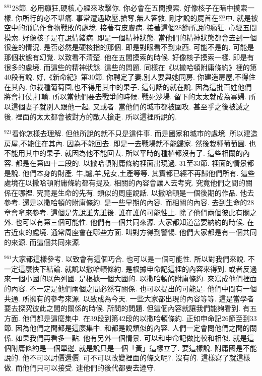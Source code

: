 \documentclass{book}
\begin{document}
$^{881}$28節.
必用癲狂,硬核,心經來攻擊你.
你必會在五間摸索.
好像核子在暗中摸索一樣.
你所行的必不堪痛.
事常遭遇欺壓,搶奪,無人答救.
剛才說的屍首在空中.
就是被空中的飛鳥作食物戰敗的處境.
接著有皮膚病.
接著這個28節所說的癲狂.
心經五間摸索.
好像核子是在說情緒病.
即是一個精神狀態.
當他們的精神狀態都會去到一個很差的情況.
是否必然是硬核指的那個.
即是對眼看不到東西.
可能不是的.
可能是那個狀態有幻覺.
以致看不清楚.
他在五間摸索的時候.
好像核子摸索一樣.
即是有很多的處境.
而這些的精神狀態.
這些的問題.
同樣在《以撒哈頓附庸條約》裡的第40段有說.
好,《新命紀》第30節.
你聘定了妻,別人要與她同房.
你建造房屋,不得住在其內.
你栽種葡萄園,也不得用其中的果子.
這句話的就在說.
因為這批百姓他們將會打仗,打輸.
所以當他們要去戰爭的時候.
戰死沙場.
留下的太太就成為寡婦.
所以這個妻子就別人跟他一起.
又或者.
當他們的城市都被圍攻.
甚至乎之後被滅之後.
裡面的太太都會被對方的敵人搶走.
所以這裡所說的.

$^{921}$看你怎樣去理解.
但他所說的就不只是這件事.
而是國家和城市的處境.
所以建造房屋,不能住在其內.
因為不能回去.
即是一去戰場就不能歸家.
然後栽種葡萄園.
也不能用其中的果子.
就因為他不能回去.
所以平時的種植都沒有了.
這些相關的內容.
都是在第四十二段的.
以撒哈頓附庸條約裡面出現過.
31至33節.
裡面的情景都是說.
他們本身的財產.
牛,驢,羊,兒女,土產等等.
其實都已經不再歸他們所有.
這些處境在以撒哈頓附庸條約都有提及.
相關的內容會讓人去考究.
究竟他們之間的關係在哪裡.
究竟是生命的先有.
類似的周座說話.
以撒哈頓是一個後期的作品.
他去參考.
還是以撒哈頓的附庸條約.
是一些早期的內容.
而相關的內容.
去到生命的28章會拿來參考.
這個是先說誰先誰後.
誰在誰的可能性上.
除了他們兩個彼此有關之外.
也可以有第三個可能性.
他們有一個共同來源.
大家都知道當要納約的時候.
在古近東的處境.
通常周座會在哪些方面.
叫對方得到警惕.
他們大家都是有一個共同的來源.
而這個共同來源.

$^{961}$大家都這樣參考.
以致會有這個巧合.
也可以是一個可能性.
所以對我們來說.
不一定這麼快下結論.
就說以撒哈頓條約.
是根據申命記這裡的內容來得到.
或者反過來一個小國的以色列國.
是根據一個大國的.
以撒哈頓的附庸條約.
來寫成他們裡面的內容.
不一定是他們兩個之間必然有關係.
也可以提出的可能是.
他們中間有一個共通.
所擁有的參考來源.
以致成為今天.
一些大家都出現的內容等等.
這是當學者要去探究彼此之間的關係的時候.
所問的問題.
但這個內容就讓我們能夠看到.
有五方面.
他們都是這麼集中.
在39段到第42段的以撒哈頓條約.
正如申命記26節至到33節.
因為他們之間都是這麼集中.
和都是說類似的內容.
人們一定會問他們之間的關係.
如果我們再看多一點.
他有另外一個情景.
可以和申命記做比較和相似.
就是這個附庸條約是一個單邊.
就是說只是一個「黃」這樣立了.
要這樣說.
附庸國是不能說的.
他不可以討價還價.
可不可以改變裡面的條文呢?.
沒有的.
這樣寫了就這樣做.
而他們只可以接受.
連他們的後代都要去遵守.
\end{document}

